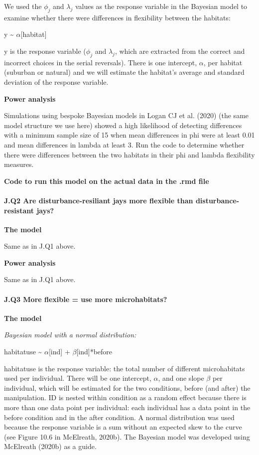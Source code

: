 \documentclass[
]{article}
\begin{document}
We used the \(\phi_j\) and \(\lambda_j\) values as the response variable
in the Bayesian model to examine whether there were differences in
flexibility between the habitats:

y \textasciitilde{} \(\alpha\){[}habitat{]}

y is the response variable (\(\phi_j\) and \(\lambda_j\), which are
extracted from the correct and incorrect choices in the serial
reversals). There is one intercept, \(\alpha\), per habitat (suburban or
natural) and we will estimate the habitat's average and standard
deviation of the response variable.

\textbf{Power analysis}

Simulations using bespoke Bayesian models in Logan CJ et al. (2020) (the
same model structure we use here) showed a high likelihood of detecting
differences with a minimum sample size of 15 when mean differences in
phi were at least 0.01 and mean differences in lambda at least 3. Run
the code to determine whether there were differences between the two
habitats in their phi and lambda flexibility measures.

\textbf{Code to run this model on the actual data in the .rmd file}

\paragraph{J.Q2 Are disturbance-resiliant jays more flexible than
disturbance-resistant
jays?}\label{j.q2-are-disturbance-resiliant-jays-more-flexible-than-disturbance-resistant-jays-1}

\textbf{The model}

Same as in J.Q1 above.

\textbf{Power analysis}

Same as in J.Q1 above.

\paragraph{J.Q3 More flexible = use more
microhabitats?}\label{j.q3-more-flexible-use-more-microhabitats}

\textbf{The model}

\emph{Bayesian model with a normal distribution:}

habitatuse \textasciitilde{} \(\alpha\){[}ind{]} +
\(\beta\){[}ind{]}*before

habitatuse is the response variable: the total number of different
microhabitats used per individual. There will be one intercept,
\(\alpha\), and one slope \(\beta\) per individual, which will be
estimated for the two conditions, before (and after) the manipulation.
ID is nested within condition as a random effect because there is more
than one data point per individual: each individual has a data point in
the before condition and in the after condition. A normal distribution
was used because the response variable is a sum without an expected skew
to the curve (see Figure 10.6 in McElreath, 2020b). The Bayesian model
was developed using McElreath (2020b) as a guide.
\end{document}
